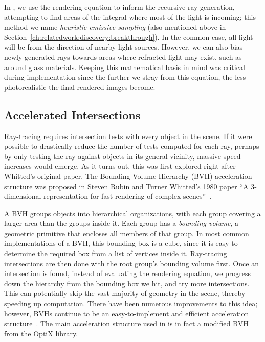 In \name{}, we use the rendering equation to inform the recursive ray generation, attempting to find areas of the integral where most of the light is incoming; this method we name {\it heuristic emissive sampling\/} (also mentioned above in Section~\ref{ch:relatedwork:discovery:breakthrough}).
In the common case, all light will be from the direction of nearby light sources.
However, we can also bias newly generated rays towards areas where refracted light may exist, such as around glass materials.
Keeping this mathematical basis in mind was critical during implementation since the further we stray from this equation, the less photorealistic the final rendered images become.



\subsection{Accelerated Intersections}

Ray-tracing requires intersection tests with every object in the scene.
If it were possible to drastically reduce the number of tests computed for each ray, perhaps by only testing the ray against objects in its general vicinity, massive speed increases would emerge.
As it turns out, this was first explored right after Whitted's original paper.
The Bounding Volume Hierarchy (BVH) acceleration structure was proposed in Steven Rubin and Turner Whitted's 1980 paper ``A 3-dimensional representation for fast rendering of complex scenes''~\cite{rubin1980}.

A BVH groups objects into hierarchical organizations, with each group covering a larger area than the groups inside it.
Each group has a {\it bounding volume\/}, a geometric primitive that encloses all members of that group.
In most common implementations of a BVH, this bounding box is a cube, since it is easy to determine the required box from a list of vertices inside it.
Ray-tracing intersections are then done with the root group's bounding volume first.
Once an intersection is found, instead of evaluating the rendering equation, we progress down the hierarchy from the bounding box we hit, and try more intersections.
This can potentially skip the vast majority of geometry in the scene, thereby speeding up computation.
There have been numerous improvements to this idea; however, BVHs continue to be an easy-to-implement and efficient acceleration structure~\cite{prunier2017bvh}.
The main acceleration structure used in \name{} is in fact a modified BVH from the OptiX library.


